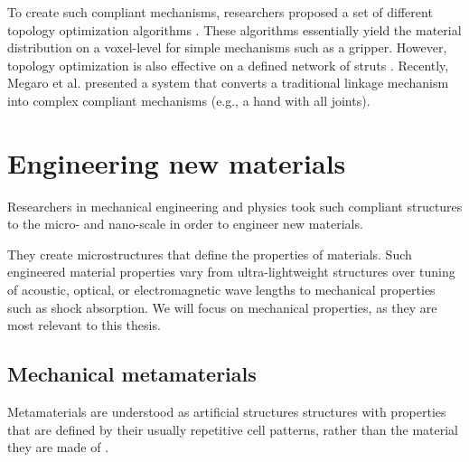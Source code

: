 {To create such compliant mechanisms, researchers proposed a set of different topology optimization algorithms \cite{Sigmund1997a, Zhu2013, Zhu2014}. These algorithms essentially yield the material distribution on a voxel-level for simple mechanisms such as a gripper. However, topology optimization is also effective on a defined network of struts \cite{Mankame2004, Mankame2006, Saxena2005}. Recently, Megaro et al. \cite{Megaro2017} presented a system that converts a traditional linkage mechanism into complex compliant mechanisms (e.g., a hand with all joints).










\section{Engineering new materials}

Researchers in mechanical engineering and physics took such compliant structures to the micro- and nano-scale in order to engineer new materials. 



They create microstructures that define the properties of materials. Such engineered material properties vary from ultra-lightweight structures over tuning of acoustic, optical, or electromagnetic wave lengths to mechanical properties such as shock absorption. We will focus on mechanical properties, as they are most relevant to this thesis. 

\subsection{Mechanical metamaterials}
Metamaterials are understood as artificial structures structures with properties that are defined by their usually repetitive cell patterns, rather than the material they are made of \cite{Bertoldi2017, Christensen2015, Paulose2015}.  

}
